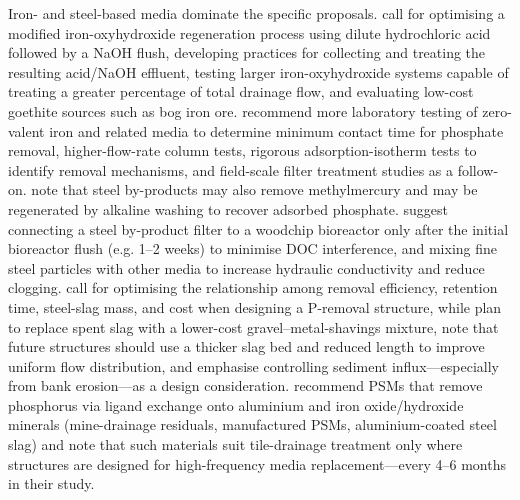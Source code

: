 \documentclass[11pt]{article}
\begin{document}
Iron- and steel-based media dominate the specific proposals. \textcite{Allred2017} call for optimising a modified iron-oxyhydroxide regeneration process using dilute hydrochloric acid followed by a NaOH flush, developing practices for collecting and treating the resulting acid/NaOH effluent, testing larger iron-oxyhydroxide systems capable of treating a greater percentage of total drainage flow, and evaluating low-cost goethite sources such as bog iron ore. \textcite{Allred2014} recommend more laboratory testing of zero-valent iron and related media to determine minimum contact time for phosphate removal, higher-flow-rate column tests, rigorous adsorption-isotherm tests to identify removal mechanisms, and field-scale filter treatment studies as a follow-on. \textcite{Hua2016} note that steel by-products may also remove methylmercury and may be regenerated by alkaline washing to recover adsorbed phosphate. \textcite{Sellner2019b} suggest connecting a steel by-product filter to a woodchip bioreactor only after the initial bioreactor flush (e.g. 1--2 weeks) to minimise DOC interference, and mixing fine steel particles with other media to increase hydraulic conductivity and reduce clogging. \textcite{Wang2020d} call for optimising the relationship among removal efficiency, retention time, steel-slag mass, and cost when designing a P-removal structure, while \textcite{Shedekar2020} plan to replace spent slag with a lower-cost gravel--metal-shavings mixture, note that future structures should use a thicker slag bed and reduced length to improve uniform flow distribution, and emphasise controlling sediment influx---especially from bank erosion---as a design consideration. \textcite{Penn2020} recommend PSMs that remove phosphorus via ligand exchange onto aluminium and iron oxide/hydroxide minerals (mine-drainage residuals, manufactured PSMs, aluminium-coated steel slag) and note that such materials suit tile-drainage treatment only where structures are designed for high-frequency media replacement---every 4--6 months in their study.
\end{document}
